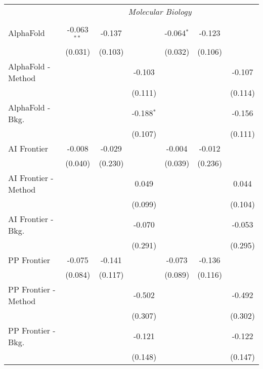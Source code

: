\begin{tabular}{lcccccc}
 & \multicolumn{6}{c}{\textit{Molecular Biology}} \\ \\
   AlphaFold            & -0.063$^{**}$ & -0.137  &              & -0.064$^{*}$ & -0.123  &   \\   
                        & (0.031)       & (0.103) &              & (0.032)      & (0.106) &   \\   
   AlphaFold - Method   &               &         & -0.103       &              &         & -0.107\\   
                        &               &         & (0.111)      &              &         & (0.114)\\   
   AlphaFold - Bkg.     &               &         & -0.188$^{*}$ &              &         & -0.156\\   
                        &               &         & (0.107)      &              &         & (0.111)\\   
   AI Frontier          & -0.008        & -0.029  &              & -0.004       & -0.012  &   \\   
                        & (0.040)       & (0.230) &              & (0.039)      & (0.236) &   \\   
   AI Frontier - Method &               &         & 0.049        &              &         & 0.044\\   
                        &               &         & (0.099)      &              &         & (0.104)\\   
   AI Frontier - Bkg.   &               &         & -0.070       &              &         & -0.053\\   
                        &               &         & (0.291)      &              &         & (0.295)\\   
   PP Frontier          & -0.075        & -0.141  &              & -0.073       & -0.136  &   \\   
                        & (0.084)       & (0.117) &              & (0.089)      & (0.116) &   \\   
   PP Frontier - Method &               &         & -0.502       &              &         & -0.492\\   
                        &               &         & (0.307)      &              &         & (0.302)\\   
   PP Frontier - Bkg.   &               &         & -0.121       &              &         & -0.122\\   
                        &               &         & (0.148)      &              &         & (0.147)\\   

\end{tabular}

